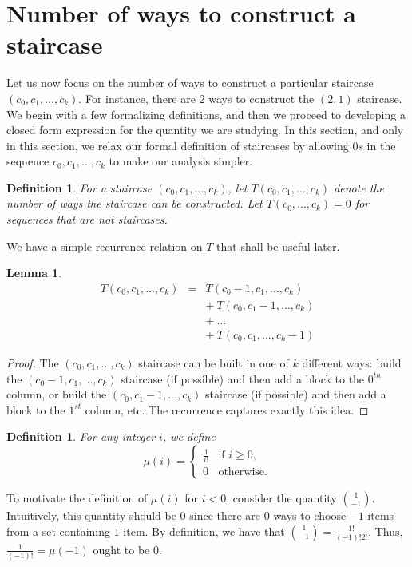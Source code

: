 \documentclass[12pt]{amsart}
\newtheorem{definition}[theorem]{Definition}
\newtheorem{lemma}[theorem]{Lemma}
\newcommand{\ifact}{\mu}
\newcommand{\newsection}[2]{
\section{#1 \label{#2}}
}
\begin{document}
\newsection{Number of ways to construct a staircase}{sec:numconstructions}
Let us now focus on the number of ways to construct a particular staircase $(c_0, c_1, \dots, c_k)$. For instance, there are $2$ ways to construct the $(2,1)$ staircase. We begin with a few formalizing definitions, and then we proceed to developing a closed form expression for the quantity we are studying. In this section, and only in this section, we relax our formal definition of staircases by allowing $0s$ in the sequence $c_0, c_1, \dots, c_k$ to make our analysis simpler.

\begin{definition}
For a staircase $(c_0, c_1, \dots, c_k)$, let $T(c_0, c_1, \dots, c_k)$ denote the number of ways the staircase can be constructed. Let $T(c_0, \dots, c_k) = 0$ for sequences that are not staircases.
\end{definition}

We have a simple recurrence relation on $T$ that shall be useful later.

\begin{lemma}
$$\begin{array}{ccl}
T(c_0, c_1, \dots, c_k) & = & T(c_0-1, c_1, \dots, c_k) \\
& & +\ T(c_0, c_1-1, \dots, c_k) \\
& & +\ \dots \\
& & +\ T(c_0, c_1, \dots, c_k-1)
\end{array}$$
\label{lem:recurrence}
\end{lemma}

\begin{proof}
The $(c_0, c_1, \dots, c_k)$ staircase can be built in one of $k$ different ways: build the $(c_0-1, c_1, \dots, c_k)$ staircase (if possible) and then add a block to the $0^{th}$ column, or build the $(c_0, c_1-1, \dots, c_k)$ staircase (if possible) and then add a block to the $1^{st}$ column, etc. The recurrence captures exactly this idea. 
\end{proof}

\begin{definition}
For any integer $i$, we define
$$
\ifact(i) = 
\begin{cases}
\frac{1}{i!} & \text{if } i \geq 0, \\
0 & \text{otherwise.}
\end{cases}
$$
\end{definition}

To motivate the definition of $\ifact(i)$ for $i < 0$, consider the quantity $\binom{1}{-1}$. Intuitively, this quantity should be $0$ since there are $0$ ways to choose $-1$ items from a set containing $1$ item. By definition, we have that $\binom{1}{-1} = \frac{1!}{(-1)!2!}$. Thus, $\frac{1}{(-1)!} = \ifact(-1)$ ought to be $0$.
\end{document}
